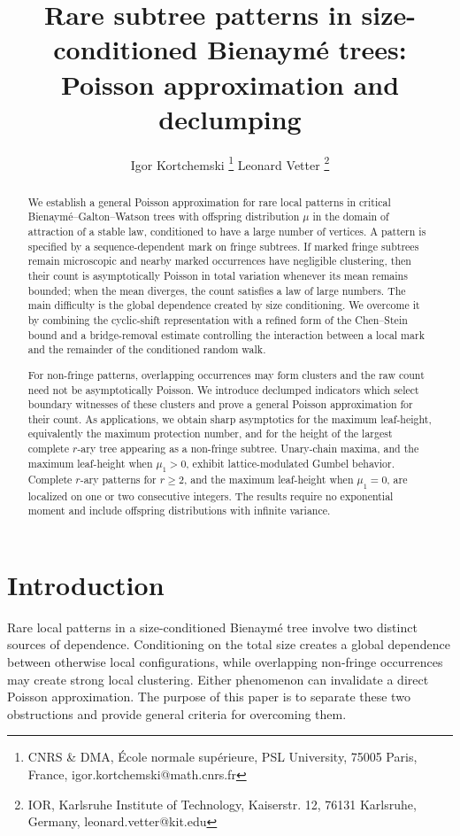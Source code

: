 \documentclass[a4paper,11pt]{article}
\title{Rare subtree patterns in size-conditioned Bienaymé trees: Poisson approximation and declumping}
\author{
%
Igor Kortchemski 
\thanks{CNRS \& DMA, École normale supérieure, PSL University, 75005 Paris, France, \textsf{igor.kortchemski@math.cnrs.fr}
} 
\qquad
Leonard Vetter 
\thanks{IOR, Karlsruhe Institute of Technology, Kaiserstr.
12, 76131 Karlsruhe, Germany, \textsf{leonard.vetter@kit.edu}
}   
}\date{}
\DeclareRobustCommand{\1}{\mathbf{1}}
\begin{document}
\maketitle

\begin{abstract}
We establish a general Poisson approximation for rare local patterns in
critical Bienaym\'e--Galton--Watson trees with offspring distribution $\mu$ in
the domain of attraction of a stable law, conditioned to have a large number of vertices. A
pattern is specified by a sequence-dependent mark on fringe subtrees. If
marked fringe subtrees remain microscopic and nearby marked occurrences have
negligible clustering, then their count is asymptotically Poisson in
total variation whenever its mean remains bounded; when the mean diverges, the
count satisfies a law of large numbers. The main difficulty is the global
dependence created by size conditioning. We overcome it by combining the
cyclic-shift representation with a refined form of the Chen--Stein bound and a bridge-removal estimate
controlling the interaction between a local mark and the remainder of the
conditioned random walk.

For non-fringe patterns, overlapping occurrences may form clusters and the raw
count need not be asymptotically Poisson. We introduce declumped indicators
which select boundary witnesses of these clusters and prove a general Poisson
approximation for their count. As applications, we obtain sharp asymptotics
for the maximum leaf-height, equivalently the maximum protection number, and for the height of the largest complete
$r$-ary tree appearing as a non-fringe subtree. Unary-chain maxima, and the
maximum leaf-height when $\mu_1>0$, exhibit lattice-modulated Gumbel
behavior. Complete $r$-ary patterns for $r\ge2$, and the maximum leaf-height when $\mu_1=0$, are localized on one or two consecutive integers. The
results require no exponential moment and include offspring distributions
with infinite variance.
\end{abstract}


\section{Introduction}\label{sec:intro}

Rare local patterns in a size-conditioned Bienaymé tree involve two distinct sources of dependence. Conditioning on the total size creates a global dependence between otherwise local configurations, while overlapping non-fringe occurrences may create strong local clustering. Either phenomenon can invalidate a direct Poisson approximation. The purpose of this paper is to separate these two obstructions and provide general criteria for overcoming them.
\end{document}
